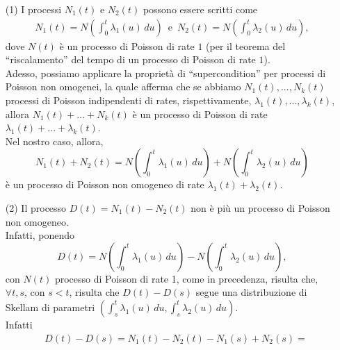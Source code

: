\documentclass[12pt]{homework}
\begin{document}
\begin{enumerate}
\item[(1)]
  I processi $N_{1}\left(t\right)$ e $N_{2}\left(t\right)$ possono essere scritti come
  \begin{align*}
  N_{1}\left(t\right)=N\left(\int_{0}^{t}\lambda_{1}\left(u\right) \,du\right) \,\,\, \text{e} \,\,\, N_{2}\left(t\right)=N\left(\int_{0}^{t}\lambda_{2}\left(u\right) \,du \right),
  \end{align*}
  dove $N\left(t\right)$ è un processo di Poisson di rate $1$ (per il teorema del ``riscalamento'' del tempo di un processo di Poisson di rate $1$).\\
  Adesso, possiamo applicare la proprietà di ``supercondition'' per processi di Poisson non omogenei, la quale afferma che se abbiamo $N_{1}\left(t\right),...,N_{k}\left(t\right)$ processi di Poisson indipendenti di rates, rispettivamente, $\lambda_{1}\left(t\right),...,\lambda_{k}\left(t\right)$, allora $N_{1}\left(t\right)+...+N_{k}\left(t\right)$ è un processo di Poisson di rate $\lambda_{1}\left(t\right)+...+\lambda_{k}\left(t\right)$.\\
  Nel nostro caso, allora,
  \begin{equation*}
  N_{1}\left(t\right)+N_{2}\left(t\right)= N\left(\int_{0}^{t}\lambda_{1}\left(u\right) \,du\right) + N\left(\int_{0}^{t}\lambda_{2}\left(u\right) \,du \right)
  \end{equation*}
  è un processo di Poisson non omogeneo di rate $\lambda_{1}\left(t\right)+\lambda_{2}\left(t\right)$.\\
  \item[(2)]
  Il processo $D\left(t\right)=N_{1}\left(t\right)-N_{2}\left(t\right)$ non è più un processo di Poisson non omogeneo.\\
  Infatti, ponendo
  \begin{equation*}
  D\left(t\right)=N\left(\int_{0}^{t}\lambda_{1}\left(u\right) \,du\right) - N\left(\int_{0}^{t}\lambda_{2}\left(u\right) \,du \right),
  \end{equation*}
   con $N\left(t\right)$ processo di Poisson di rate 1, come in precedenza, risulta che, $\forall t,s$, con $s<t$, risulta che $D\left(t\right)-D\left(s\right)$ segue una distribuzione di Skellam di parametri $\left(\int_{s}^{t}\lambda_{1}\left(u\right) \,du,\int_{s}^{t}\lambda_{2}\left(u\right) \,du \right)$.\\
   Infatti
   \begin{align*}
   &D\left(t\right)-D\left(s\right)=  N_{1}\left(t\right)-N_{2}\left(t\right)-N_{1}\left(s\right)+N_{2}\left(s\right)=\\

\end{align*}
\end{enumerate}
\end{document}
